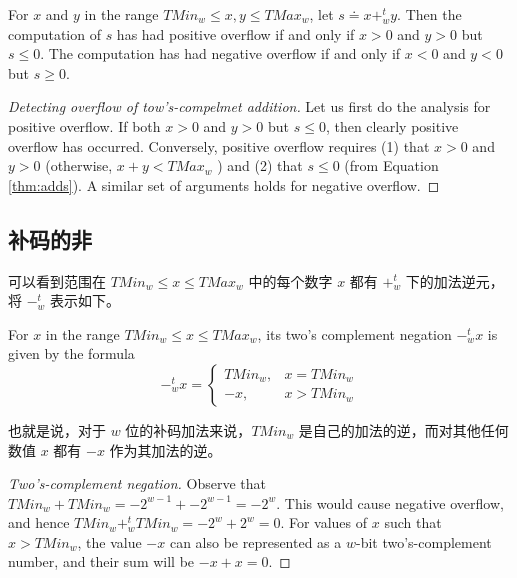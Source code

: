 \begin{theorem}
    For $x$ and $y$ in the range $TMin_w \leq x, y \leq TMax_w$, let $s \doteq x +^t_w y$. Then the computation of $s$ has had positive overflow if and only if $x > 0$ and $y > 0$ but $s \leq 0$. The computation has had negative overflow if and only if $x < 0$ and $y < 0$ but $s \geq 0$.
\end{theorem}

\begin{proof}[Detecting overflow of tow's-compelmet addition]
    Let us first do the analysis for positive overflow. If both $x > 0$ and $y > 0$ but $s \leq 0$, then clearly positive overflow has occurred. Conversely, positive overflow requires (1) that $x > 0$ and $y > 0$ (otherwise, $x + y < TMax_w$ ) and (2) that $s ≤ 0$ (from Equation \eqref{thm:adds}). A similar set of arguments holds for negative overflow.
\end{proof}

\subsection{补码的非}

可以看到范围在 $TMin_w \leq x \leq TMax_w$ 中的每个数字 $x$ 都有 $+^t_w$ 下的加法逆元，将 $-^t_w$ 表示如下。

\begin{theorem}
    For $x$ in the range $TMin_w \leq x \leq TMax_w$, its two's complement negation $-^t_w x$ is given by the formula
    \begin{equation}
        -^t_w x = \left\{
        \begin{array}{ll}
            TMin_w, & x = TMin_w \\
            -x, & x > TMin_w
        \end{array}
        \right.
    \label{thm:negs}
    \end{equation}
\end{theorem}

也就是说，对于 $w$ 位的补码加法来说，$TMin_w$ 是自己的加法的逆，而对其他任何数值 $x$ 都有 $-x$ 作为其加法的逆。

\begin{proof}[Two's-complement negation]
    Observe that $TMin_w + TMin_w = −2^{w−1} + −2^{w−1} = −2^w$. This would cause negative overflow, and hence $TMin_w +^t_w TMin_w = −2^w + 2^w = 0$. For values of $x$ such that $x > TMin_w$, the value $−x$ can also be represented as a $w$-bit two’s-complement number, and their sum will be $−x + x = 0$.
\end{proof}

